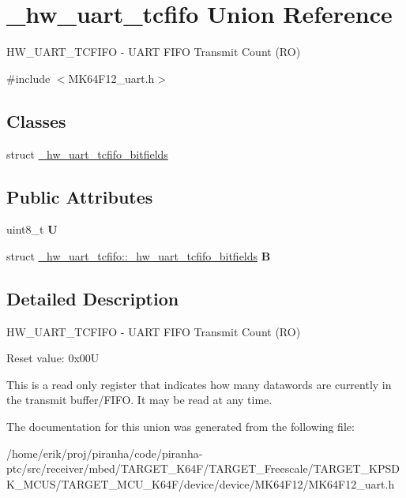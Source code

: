 \hypertarget{union__hw__uart__tcfifo}{}\section{\+\_\+hw\+\_\+uart\+\_\+tcfifo Union Reference}
\label{union__hw__uart__tcfifo}


H\+W\+\_\+\+U\+A\+R\+T\+\_\+\+T\+C\+F\+I\+FO -\/ U\+A\+RT F\+I\+FO Transmit Count (RO)  




{\ttfamily \#include $<$M\+K64\+F12\+\_\+uart.\+h$>$}

\subsection*{Classes}
\begin{DoxyCompactItemize}
\item 
struct \hyperlink{struct__hw__uart__tcfifo_1_1__hw__uart__tcfifo__bitfields}{\+\_\+hw\+\_\+uart\+\_\+tcfifo\+\_\+bitfields}
\end{DoxyCompactItemize}
\subsection*{Public Attributes}
\begin{DoxyCompactItemize}
\item 
uint8\+\_\+t {\bfseries U}\hypertarget{union__hw__uart__tcfifo_ac25bec507228b11b53312ba730e762ba}{}\label{union__hw__uart__tcfifo_ac25bec507228b11b53312ba730e762ba}

\item 
struct \hyperlink{struct__hw__uart__tcfifo_1_1__hw__uart__tcfifo__bitfields}{\+\_\+hw\+\_\+uart\+\_\+tcfifo\+::\+\_\+hw\+\_\+uart\+\_\+tcfifo\+\_\+bitfields} {\bfseries B}\hypertarget{union__hw__uart__tcfifo_ab1cfadabd24791c04786938959729764}{}\label{union__hw__uart__tcfifo_ab1cfadabd24791c04786938959729764}

\end{DoxyCompactItemize}


\subsection{Detailed Description}
H\+W\+\_\+\+U\+A\+R\+T\+\_\+\+T\+C\+F\+I\+FO -\/ U\+A\+RT F\+I\+FO Transmit Count (RO) 

Reset value\+: 0x00U

This is a read only register that indicates how many datawords are currently in the transmit buffer/\+F\+I\+FO. It may be read at any time. 

The documentation for this union was generated from the following file\+:\begin{DoxyCompactItemize}
\item 
/home/erik/proj/piranha/code/piranha-\/ptc/src/receiver/mbed/\+T\+A\+R\+G\+E\+T\+\_\+\+K64\+F/\+T\+A\+R\+G\+E\+T\+\_\+\+Freescale/\+T\+A\+R\+G\+E\+T\+\_\+\+K\+P\+S\+D\+K\+\_\+\+M\+C\+U\+S/\+T\+A\+R\+G\+E\+T\+\_\+\+M\+C\+U\+\_\+\+K64\+F/device/device/\+M\+K64\+F12/M\+K64\+F12\+\_\+uart.\+h\end{DoxyCompactItemize}
